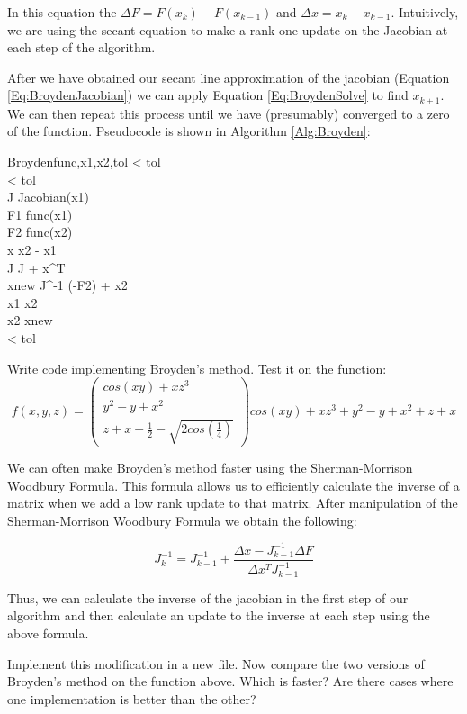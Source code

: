 In this equation the $\Delta F = F(x_k)-F(x_{k-1})$ and $\Delta x = x_k-x_{k-1}$. Intuitively, we are using the secant equation to make a rank-one update on the Jacobian at each step of the algorithm.

After we have obtained our secant line approximation of the jacobian (Equation \ref{Eq:BroydenJacobian}) we can apply Equation \ref{Eq:BroydenSolve} to find $x_{k+1}$. We can then repeat this process until we have (presumably) converged to a zero of the function. Pseudocode is shown in Algorithm \ref{Alg:Broyden}:

\begin{pseudo}{Broyden}{func,x1,x2,tol}
\label{Alg:Broyden}
\IF {} < tol \THEN
    \\
\IF {} < tol \THEN
    \\

J \GETS Jacobian(x1) \\

\REPEAT 
F1 \GETS func(x1) \\
F2 \GETS func(x2) \\
\Delta x \GETS x2 - x1 \\
J \GETS J + \Delta x^T \\
xnew \GETS J^{-1} (-F2) + x2 \\
x1 \GETS x2 \\
x2 \GETS xnew \\
\UNTIL {} < tol \THEN {}
\end{pseudo}

\begin{problem}
Write code implementing Broyden's method. Test it on the function:
\[
f(x,y,z) = 
 \left( \begin{array}{ccc}
cos(xy)+ xz^3 \\
y^2 - y + x^2 \\
z + x-\frac{1}{2}-\sqrt{2cos(\frac{1}{4})} \end{array} \right)
cos(xy) + xz^3 + y^2 - y + x^2 + z + x
\]
\end{problem}

We can often make Broyden's method faster using the Sherman-Morrison Woodbury Formula. This formula allows us to efficiently calculate the inverse of a matrix when we add a low rank update to that matrix. After manipulation of the Sherman-Morrison Woodbury Formula we obtain the following:

\[
J_k^{-1} = J_{k-1}^{-1} + \frac{\Delta x - J_{k-1}^{-1}\Delta F}{\Delta x^T J_{k-1}^{-1}}
\]

Thus, we can calculate the inverse of the jacobian in the first step of our algorithm and then calculate an update to the inverse at each step using the above formula.

\begin{problem}
Implement this modification in a new file. Now compare the two versions of Broyden's method on the function above. Which is faster? Are there cases where one implementation is better than the other?
\end{problem}
